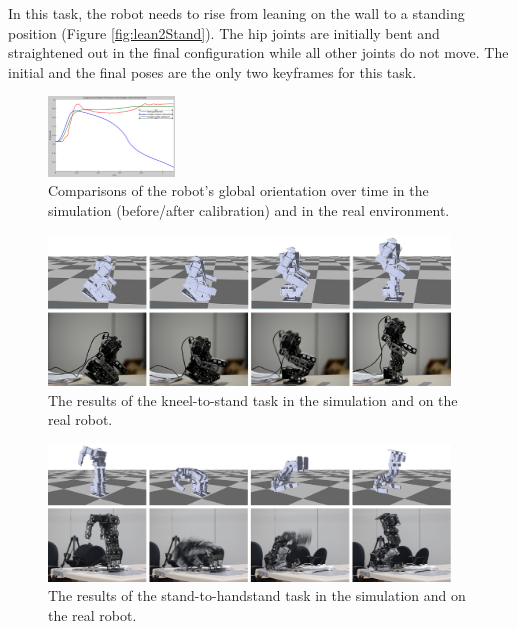 In this task, the robot needs to rise from leaning on the wall to a standing position (Figure \ref{fig:lean2Stand}). The hip joints are initially bent and straightened out in the final configuration while all other joints do not move. The initial and the final poses are the only two keyframes for this task.

\begin{figure}[!b]
  \centering
  \includegraphics[width=0.3\textwidth]{figures/simRobotCompare}
  \caption{Comparisons of the robot's global orientation over time in the simulation (before/after calibration) and in the real environment.}
  \vspace{-0.1in}
  \label{fig:simRobotCompare}
\end{figure}


\begin{figure}[!t]
  \centering
  \includegraphics[width=0.95\textwidth]{figures/kneel2Stand}
  \caption{The results of the kneel-to-stand task in the simulation and on the real robot.}
  \vspace{-0.1in}
  \label{fig:kneel2Stand}
\end{figure}

\begin{figure}[!t]
  \centering
  \includegraphics[width=0.95\textwidth]{figures/stand2Hand}
  \caption{The results of the stand-to-handstand task in the simulation and on the real robot.}
  \vspace{-0.1in}
  \label{fig:stand2Hand}
\end{figure}

